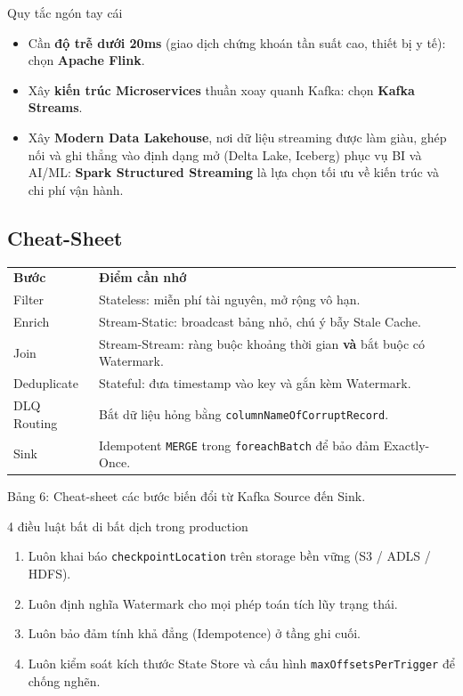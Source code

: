 \documentclass[12pt]{article}
\begin{document}
\begin{guidelinebox}{Quy tắc ngón tay cái}
\begin{itemize}
    \item Cần \textbf{độ trễ dưới 20ms} (giao dịch chứng khoán tần suất cao, thiết bị y tế): chọn \textbf{Apache Flink}.
    \item Xây \textbf{kiến trúc Microservices} thuần xoay quanh Kafka: chọn \textbf{Kafka Streams}.
    \item Xây \textbf{Modern Data Lakehouse}, nơi dữ liệu streaming được làm giàu, ghép nối và ghi thẳng vào định dạng mở (Delta Lake, Iceberg) phục vụ BI và AI/ML: \textbf{Spark Structured Streaming} là lựa chọn tối ưu về kiến trúc và chi phí vận hành.
\end{itemize}
\end{guidelinebox}

\subsection{Cheat-Sheet}

\noindent
\begin{longtable}{@{}>{\RaggedRight\arraybackslash}p{3.2cm}>{\RaggedRight\arraybackslash}p{12.4cm}@{}}
\rowcolor{rowLavender}
\textbf{Bước} & \textbf{Điểm cần nhớ} \\
\addlinespace[3pt]
\endhead
Filter & Stateless: miễn phí tài nguyên, mở rộng vô hạn. \\
\addlinespace[3pt]
Enrich & Stream-Static: broadcast bảng nhỏ, chú ý bẫy Stale Cache. \\
\addlinespace[3pt]
Join & Stream-Stream: ràng buộc khoảng thời gian \textbf{và} bắt buộc có Watermark. \\
\addlinespace[3pt]
Deduplicate & Stateful: đưa timestamp vào key và gắn kèm Watermark. \\
\addlinespace[3pt]
DLQ Routing & Bắt dữ liệu hỏng bằng \texttt{columnNameOfCorruptRecord}. \\
\addlinespace[3pt]
Sink & Idempotent \texttt{MERGE} trong \texttt{foreachBatch} để bảo đảm Exactly-Once. \\
\end{longtable}

\begin{captionbelowboxaivn}
Bảng 6: Cheat-sheet các bước biến đổi từ Kafka Source đến Sink.
\end{captionbelowboxaivn}

\begin{guidelinebox}{4 điều luật bất di bất dịch trong production}
\begin{enumerate}
    \item Luôn khai báo \texttt{checkpointLocation} trên storage bền vững (S3 / ADLS / HDFS).
    \item Luôn định nghĩa Watermark cho mọi phép toán tích lũy trạng thái.
    \item Luôn bảo đảm tính khả đẳng (Idempotence) ở tầng ghi cuối.
    \item Luôn kiểm soát kích thước State Store và cấu hình \texttt{maxOffsetsPerTrigger} để chống nghẽn.
\end{enumerate}
\end{guidelinebox}
\end{document}
